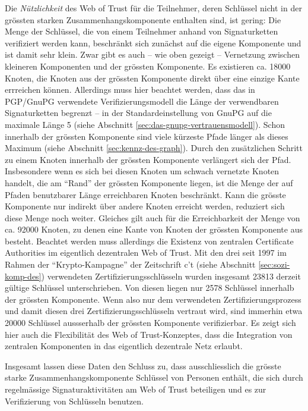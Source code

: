 Die \emph{N\"utzlichkeit} des Web of Trust f\"ur die Teilnehmer, deren
Schl\"ussel nicht in der gr\"ossten starken Zusammenhangskomponente
enthalten sind, ist gering: Die Menge der Schl\"ussel, die von einem
Teilnehmer anhand von Signaturketten verifiziert werden kann,
beschr\"ankt sich zun\"achst auf die eigene Komponente und ist damit
sehr klein. Zwar gibt es auch -- wie oben gezeigt -- Vernetzung
zwischen kleineren Komponenten und der gr\"ossten Komponente. Es
existieren ca. 18000 Knoten, die Knoten aus der gr\"ossten Komponente
direkt \"uber eine einzige Kante errreichen k\"onnen. Allerdings muss
hier beachtet werden, dass das in PGP/GnuPG verwendete
Verifizierungsmodell die L\"ange der verwendbaren Signaturketten
begrenzt -- in der Standardeinstellung von GnuPG auf die maximale
L\"ange 5 (siehe Abschnitt
\ref{sec:das-gnupg-vertrauensmodell}). Schon innerhalb der gr\"ossten
Komponente sind viele k\"urzeste Pfade l\"anger als dieses Maximum
(siehe Abschnitt \ref{sec:kennz-des-graph}). Durch den zus\"atzlichen
Schritt zu einem Knoten innerhalb der gr\"ossten Komponente
verl\"angert sich der Pfad. Insbesondere wenn es sich bei diesen
Knoten um schwach vernetzte Knoten handelt, die am ``Rand'' der
gr\"ossten Komponente liegen, ist die Menge der auf Pfaden benutzbarer
L\"ange erreichbaren Knoten beschr\"ankt. Kann die gr\"osste
Komponente nur indirekt \"uber andere Knoten erreicht werden,
reduziert sich diese Menge noch weiter. Gleiches gilt auch f\"ur die
Erreichbarkeit der Menge von ca. 92000 Knoten, zu denen eine Kante von
Knoten der gr\"ossten Komponente aus besteht. Beachtet werden muss
allerdings die Existenz von zentralen Certificate Authorities im
eigentlich dezentralen Web of Trust. Mit den drei seit 1997 im Rahmen der
``Krypto-Kampagne'' der Zeitschrift c't (siehe Abschnitt
\ref{sec:sozi-komp-des}) verwendeten Zertifizierungsschl\"usseln
wurden insgesamt 23813 derzeit g\"ultige Schl\"ussel
unterschrieben. Von diesen liegen nur 2578 Schl\"ussel innerhalb der
gr\"ossten Komponente. Wenn also nur dem verwendeten
Zertifizierungsprozess und damit diesen drei
Zertifizierungsschl\"usseln vertraut wird, sind immerhin etwa 20000
Schl\"ussel aussserhalb der gr\"ossten Komponente verifizierbar. Es
zeigt sich hier auch die Flexibilit\"at des Web of Trust-Konzeptes,
dass die Integration von zentralen Komponenten in das eigentlich
dezentrale Netz erlaubt.

Insgesamt lassen diese Daten den Schluss zu, dass ausschliesslich die
gr\"osste starke Zusammenhangskomponente Schl\"ussel von Personen
enth\"alt, die sich durch regelm\"assige Signaturaktivit\"aten am Web
of Trust beteiligen und es zur Verifizierung von Schl\"usseln
benutzen. 


